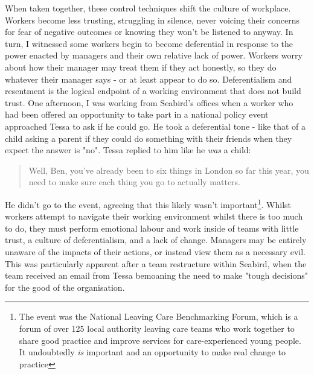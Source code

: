 When taken together, these control techniques shift the culture of workplace. Workers become less trusting, struggling in silence, never voicing their concerns for fear of negative outcomes or knowing they won’t be listened to anyway. In turn, I witnessed some workers begin to become deferential in response to the power enacted by managers and their own relative lack of power. Workers worry about how their manager may treat them if they act honestly, so they do whatever their manager says - or at least appear to do so. Deferentialism and resentment is the logical endpoint of a working environment that does not build trust. One afternoon, I was working from Seabird’s offices when a worker who had been offered an opportunity to take part in a national policy event approached Tessa to ask if he could go. He took a deferential tone - like that of a child asking a parent if they could do something with their friends when they expect the answer is "no". Tessa replied to him like he \textit{was} a child:
\begin{quote}
Well, Ben, you've already been to six things in London so far this year, you need to make sure each thing you go to actually matters.
\end{quote}
He didn’t go to the event, agreeing that this likely wasn't important\footnote{The event was the National Leaving Care Benchmarking Forum, which is a forum of over 125 local authority leaving care teams who work together to share good practice and improve services for care-experienced young people. It undoubtedly \textit{is} important and an opportunity to make real change to practice}. Whilst workers attempt to navigate their working environment whilst there is too much to do, they must perform emotional labour and work inside of teams with little trust, a culture of deferentialism, and a lack of change. Managers may be entirely  unaware of the impacts of their actions, or instead view them as a necessary evil. This was particularly apparent after a team restructure within Seabird, when the team received an email from Tessa bemoaning the need to make "tough decisions" for the good of the organisation.

